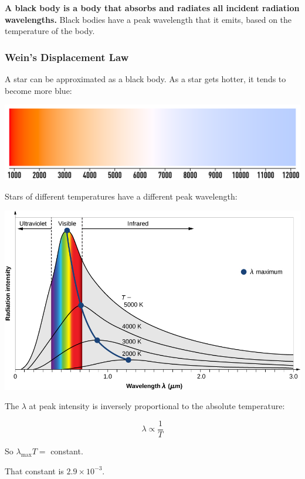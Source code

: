 \documentclass[a4paper, 12pt]{article}
\begin{document}
\textbf{A black body is a body that absorbs and radiates all incident radiation wavelengths.} Black bodies have a peak wavelength that it emits, based on the temperature of the body.

\subsubsection{Wein's Displacement Law}

A star can be approximated as a black body. As a star gets hotter, it tends to become more blue:

\begin{center}
\includegraphics[width=\textwidth]{images/blackBodyColour.png}
\end{center}

Stars of different temperatures have a different peak wavelength:

\begin{center}
\includegraphics[width=\textwidth]{images/blackBodyPeakWav.jpg}
\end{center}

The $\lambda$ at peak intensity is inversely proportional to the absolute temperature:

$$
\lambda \propto \frac{1}{T}
$$

So $\lambda_{\text{max}} T =$ constant.

That constant is $2.9 \times 10^{-3}$.
\end{document}
